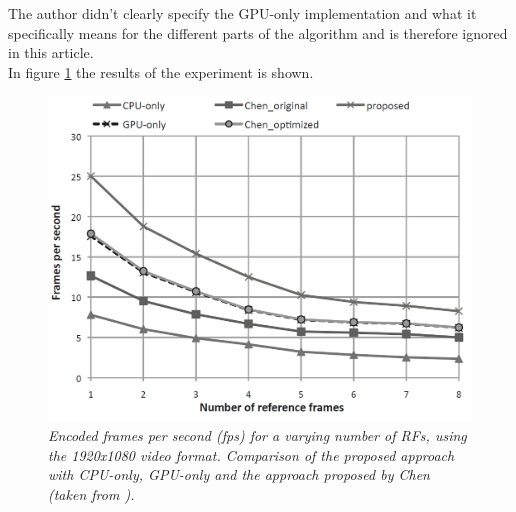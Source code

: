 The author didn't clearly specify the GPU-only implementation and  what it specifically means for the different parts of the algorithm and is therefore ignored in this article.\\
In figure \ref{dynamic_model_result} the results of the experiment is shown.

\begin{figure}[H]
\centerline{\includegraphics[scale=0.3]{pics/dynamic_model_result}} %
\caption{\label{dynamic_model_result}{\it Encoded frames per second (fps)
 for a varying number of RFs, using the 1920x1080  video format.
  Comparison of the proposed approach with CPU-only, GPU-only and the
  approach proposed by Chen (taken from \cite{Paper2}).}}
\end{figure}

